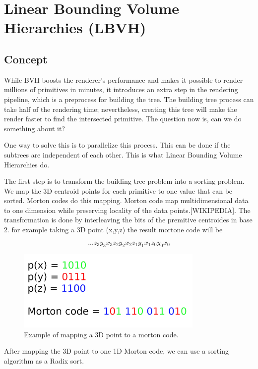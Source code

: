 \documentclass[11pt,a4paper]{article}
\begin{document}
\section{Linear Bounding Volume Hierarchies (LBVH)}
\subsection{Concept}
While BVH boosts the renderer's performance and makes it possible to render millions of primitives in minutes, it introduces an extra step in the rendering pipeline, which is a preprocess for building the tree. The building tree process can take half of the rendering time; nevertheless, creating this tree will make the render faster to find the intersected primitive. The question now is, can we do something about it? 
\\
\noindent

One way to solve this is to parallelize this process. This can be done if the subtrees are independent of each other. This is what Linear Bounding Volume Hierarchies do.
\\
\noindent

The first step is to transform the building tree problem into a sorting problem. We map the 3D centroid points for each primitive to one value that can be sorted. Morton codes do this mapping. Morton code map multidimensional data to one dimension while preserving locality of the data points.[WIKIPEDIA]. The transformation is done by interleaving the bits of the premitive centroides in base 2. for example taking a 3D point (x,y,z) the result mortone code will be 

\[ ...z_3y_3x_3z_2y_2x_2z_1y_1x_1z_0y_0x_0 \]


\begin{figure}[h]	
     \centering
     \captionsetup{justification=centering,margin=2cm}
     \includegraphics[width=9cm]{images/z_curve.png}
     \caption{Example of mapping a 3D point to a morton code.}
     \label{fig:dice}
\end{figure}


After mapping the 3D point to one 1D Morton code, we can use a sorting algorithm as a Radix sort.
\end{document}

